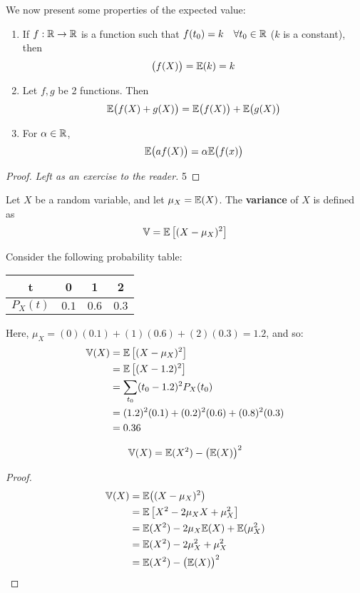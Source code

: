 \documentclass{article}
\begin{document}
	We now present some properties of the expected value:
	\begin{enumerate}
		\item If $f: \mathbb{R} \to \mathbb{R}$ is a function such that $f(t_0) = k \quad \forall t_0 \in \mathbb{R}$ ($k$ is a constant), then$$ \big( f(X) \big) = \mathbb{E}(k) = k$$
		\item Let $f, g$ be 2 functions. Then
		$$ \mathbb{E} \big( f(X) +g(X) \big) = \mathbb{E} \big( f(X) \big) + \mathbb{E} \big( g(X)\big)$$
		\item For $\alpha \in \mathbb{R}$,
		$$ \mathbb{E} \big( a f(X) \big) = \alpha \mathbb{E}\big( f(x)\big)$$
	\end{enumerate}
	\begin{proof}
		\emph{Left as an exercise to the reader.}
		5
	\end{proof}
\vspace{2cm}
	\begin{defn}
		Let $X$ be a random variable, and let $\mu_X = \mathbb{E} (X)$. The \textbf{variance} of $X$ is defined as
		$$ \mathbb{V} = \mathbb{E} \left[(X - \mu_X)^2\right]$$
	\end{defn}
\pagebreak
	\begin{exmp}
		Consider the following probability table:
		\begin{table}[h]
			\begin{tabular}{c|c|c|c}
				t & 0        & 1 & 2        \\ \hline
				$P_X(t)$ & $0.1$ & $0.6$ & $0.3$
			\end{tabular}
		\end{table}
	
		Here, $\mu_X = (0)(0.1) + (1)(0.6)+(2)(0.3) = 1.2$, and so:
		\begin{align*}
			\mathbb{V}(X) &= \mathbb{E} \left[(X - \mu_X)^2\right] \\
			&= \mathbb{E} \left[ (X -1.2)^2 \right] \\
			&= \sum_{t_0} (t_0 - 1.2)^2 P_X(t_0) \\
			&= (1.2)^2 (0.1) + (0.2)^2 (0.6) + (0.8)^2 (0.3) \\
			&= 0.36
		\end{align*}
	\end{exmp}
	\begin{prop}
		$$ \mathbb{V}(X) = \mathbb{E}(X^2) - \big( \mathbb{E}(X) \big)^2$$
	\end{prop}
	\begin{proof}
		\begin{align*}
			\mathbb{V}(X) &= \mathbb{E} \big( (X-\mu_X)^2 \big) \\
			&= \mathbb{E} \left[ X^2 - 2 \mu_X X + \mu_X^2 \right] \\
			&= \mathbb{E} (X^2) - 2 \mu_X \mathbb{E}(X) + \mathbb{E}(\mu_X^2) \\
			&= \mathbb{E}(X^2) - 2 \mu_X^2 + \mu_X^2 \\
			&= \mathbb{E} (X^2) - \big( \mathbb{E}(X) \big)^2
		\end{align*}
	\end{proof}
\end{document}
